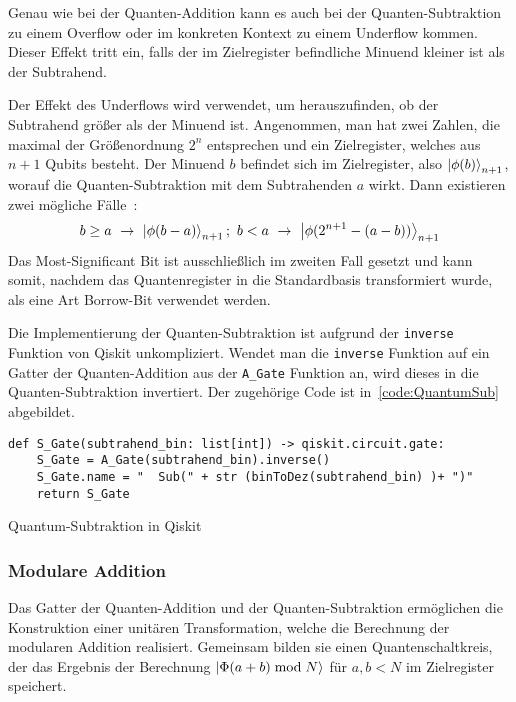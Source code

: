 Genau wie bei der Quanten-Addition kann es auch bei der Quanten-Subtraktion zu einem Overflow
oder im konkreten Kontext zu einem Underflow kommen.
Dieser Effekt tritt ein, 
falls der im Zielregister befindliche Minuend kleiner ist als der Subtrahend.

Der Effekt des Underflows wird verwendet, um herauszufinden, 
ob der Subtrahend größer als der Minuend ist.
Angenommen, man hat zwei Zahlen, 
die maximal der Größenordnung \(2^n\) entsprechen und 
ein Zielregister, 
welches aus \(n+1\) Qubits besteht.
Der Minuend \(b\) befindet sich im Zielregister, 
also \(\ket{\phi(b)}_{n+1}\), 
worauf die Quanten-Subtraktion mit dem Subtrahenden \(a\) wirkt.
Dann existieren zwei mögliche Fälle~\cite{beauregard2003circuit}:
\[b \geq a~\rightarrow~\ket{\phi(b-a)}_{n+1};~
b < a~\rightarrow~\ket{\phi(2^{n+1}-(a-b))}_{n+1}
  \]
Das Most-Significant Bit ist ausschließlich im zweiten Fall gesetzt und kann somit, 
nachdem das Quantenregister in die Standardbasis transformiert wurde, 
als eine Art Borrow-Bit verwendet werden.

Die Implementierung der Quanten-Subtraktion ist aufgrund der \texttt{inverse} Funktion von Qiskit unkompliziert.
Wendet man die \texttt{inverse} Funktion auf ein Gatter der Quanten-Addition aus der \texttt{A\_Gate} Funktion an, 
wird dieses in die Quanten-Subtraktion invertiert.
Der zugehörige Code ist in~\ref{code:QuantumSub} abgebildet.
\begin{listing}[H]
\begin{verbatim}    
def S_Gate(subtrahend_bin: list[int]) -> qiskit.circuit.gate:
    S_Gate = A_Gate(subtrahend_bin).inverse()
    S_Gate.name = "  Sub(" + str (binToDez(subtrahend_bin) )+ ")"
    return S_Gate
  \end{verbatim}
  \caption{Quantum-Subtraktion in Qiskit}
  \label{code:QuantumSub}
\end{listing}

\subsubsection{Modulare Addition} \label{sub:modulareAddition}
Das Gatter der Quanten-Addition und der Quanten-Subtraktion ermöglichen die Konstruktion einer unitären Transformation, 
welche die Berechnung der modularen Addition realisiert.
Gemeinsam bilden sie einen Quantenschaltkreis, 
der das Ergebnis der Berechnung \(\ket{\Phi(a+b)\bmod N}\) für \(a, b < N\) im Zielregister speichert.

